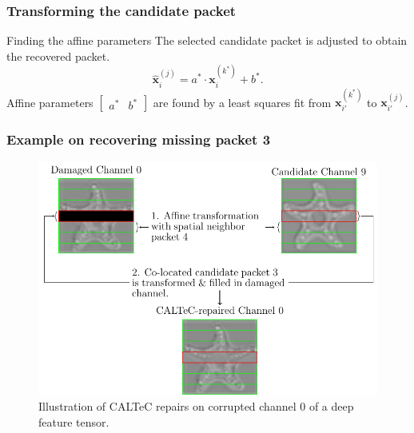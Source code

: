\documentclass[aspectratio=169]{beamer}
\begin{document}
\begin{frame}
	\frametitle{Transforming the candidate packet}
	\begin{block}{Finding the affine parameters}
		The selected candidate packet is adjusted to obtain the recovered packet.
		\[
		\widehat{\mathbf{x}}_i^{(j)} = a^*\cdot \mathbf{x}_i^{(k^*)} + b^*.
		\label{eq:recovered_packet}
		\]
		Affine parameters $\begin{bmatrix}a^*&b^* \end{bmatrix}$ are found by a least squares fit from $\mathbf{x}_{i'}^{(k^*)}$ to $\mathbf{x}_{i'}^{(j)}$.
	\end{block}
\end{frame}


\begin{frame}
	\frametitle{Example on recovering missing packet 3}
	\begin{figure}[H]
		\centering
		\includegraphics[scale=0.56]{lumimapcaltecnicer1.pdf}
		\caption{Illustration of CALTeC repairs on corrupted channel 0 of a deep feature tensor.}
	\end{figure}
\end{frame}
\end{document}
